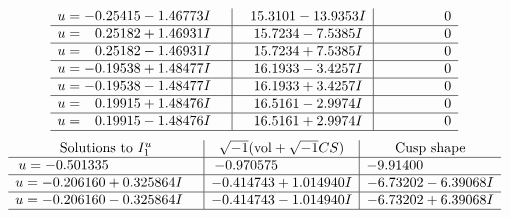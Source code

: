 \documentclass[1p]{elsarticle_modified}
\theoremstyle{definition}
\newcommand{\I}{\sqrt{-1}}
\begin{document}
$$\begin{array}{c|c|c}
\begin{aligned}
u &= -0.25415 - 1.46773 I\end{aligned}
 & \phantom{-}15.3101 - 13.9353 I & \phantom{-0.000000 } 0 \\ \hline\begin{aligned}
u &= \phantom{-}0.25182 + 1.46931 I\end{aligned}
 & \phantom{-}15.7234 - 7.5385 I & \phantom{-0.000000 } 0 \\ \hline\begin{aligned}
u &= \phantom{-}0.25182 - 1.46931 I\end{aligned}
 & \phantom{-}15.7234 + 7.5385 I & \phantom{-0.000000 } 0 \\ \hline\begin{aligned}
u &= -0.19538 + 1.48477 I\end{aligned}
 & \phantom{-}16.1933 - 3.4257 I & \phantom{-0.000000 } 0 \\ \hline\begin{aligned}
u &= -0.19538 - 1.48477 I\end{aligned}
 & \phantom{-}16.1933 + 3.4257 I & \phantom{-0.000000 } 0 \\ \hline\begin{aligned}
u &= \phantom{-}0.19915 + 1.48476 I\end{aligned}
 & \phantom{-}16.5161 - 2.9974 I & \phantom{-0.000000 } 0 \\ \hline\begin{aligned}
u &= \phantom{-}0.19915 - 1.48476 I\end{aligned}
 & \phantom{-}16.5161 + 2.9974 I & \phantom{-0.000000 } 0\\
 \hline 
 \end{array}$$\newpage$$\begin{array}{c|c|c}  
\text{Solutions to }I^u_{1}& \I (\text{vol} + \sqrt{-1}CS) & \text{Cusp shape}\\
 \hline 
\begin{aligned}
u &= -0.501335\phantom{ +0.000000I}\end{aligned}
 & -0.970575\phantom{ +0.000000I} & -9.91400\phantom{ +0.000000I} \\ \hline\begin{aligned}
u &= -0.206160 + 0.325864 I\end{aligned}
 & -0.414743 + 1.014940 I & -6.73202 - 6.39068 I \\ \hline\begin{aligned}
u &= -0.206160 - 0.325864 I\end{aligned}
 & -0.414743 - 1.014940 I & -6.73202 + 6.39068 I\\
 \hline 
 \end{array}$$\newpage
\end{document}
